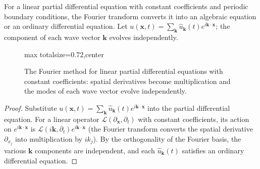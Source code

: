 \begin{proposition}\label{prop:pde_fourier_solution}
For a linear partial differential equation with constant coefficients and periodic boundary conditions, the Fourier transform converts it into an algebraic equation or an ordinary differential equation. Let $u(\mathbf{x}, t) = \sum_{\mathbf{k}} \hat{u}_{\mathbf{k}}(t) e^{i \mathbf{k} \cdot \mathbf{x}}$; the component of each wave vector $\mathbf{k}$ evolves independently.
\end{proposition}

\begin{figure}[htbp]
\centering
\begin{adjustbox}{max totalsize={\linewidth}{0.72\textheight},center}
\end{adjustbox}
\caption{The Fourier method for linear partial differential equations with constant coefficients: spatial derivatives become multiplication and the modes of each wave vector evolve independently.}
\label{fig:pde_fourier_flow}
\end{figure}

\begin{proof}
Substitute $u(\mathbf{x}, t) = \sum_{\mathbf{k}} \hat{u}_{\mathbf{k}}(t) e^{i \mathbf{k} \cdot \mathbf{x}}$ into the partial differential equation. For a linear operator $\mathcal{L}(\partial_{\mathbf{x}}, \partial_t)$ with constant coefficients, its action on $e^{i\mathbf{k}\cdot\mathbf{x}}$ is $\mathcal{L}(i\mathbf{k}, \partial_t) e^{i\mathbf{k}\cdot\mathbf{x}}$ (the Fourier transform converts the spatial derivative $\partial_{x_j}$ into multiplication by $ik_j$). By the orthogonality of the Fourier basis, the various $\mathbf{k}$ components are independent, and each $\hat{u}_{\mathbf{k}}(t)$ satisfies an ordinary differential equation.
\end{proof}


